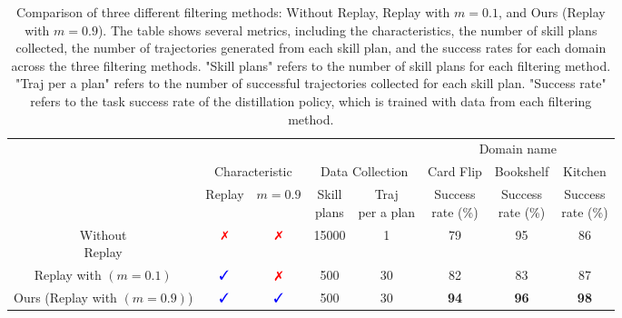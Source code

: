 \begin{table*}[ht]

\centering

\begin{tabular}{ccc|cc|c|c|c}
    \toprule
    &  & \multicolumn{2}{c}{} & & \multicolumn{3}{c}{Domain name}\\
    \cmidrule(lr){6-8}
    & \multicolumn{2}{c|}{Characteristic} & \multicolumn{2}{c|}{Data Collection} & Card Flip & Bookshelf & Kitchen   \\
    \cmidrule(lr){2-5} \cmidrule(lr){6-6}\cmidrule(lr){7-7}\cmidrule(lr){8-8}
    & Replay & $m=0.9$ & \makecell{Skill \\ plans} & \makecell{Traj \\ per a plan} &
    \makecell{Success \\ rate (\%)}  &  \makecell{Success \\ rate (\%)}  &\makecell{Success \\ rate (\%)}  \\
    \cmidrule(lr){1-1} \cmidrule(lr){2-5} \cmidrule(lr){6-6}\cmidrule(lr){7-7}\cmidrule(lr){8-8}
    \makecell{Without\\ Replay} & 
    $\textcolor{red}{\xmark}$ & 
    $\textcolor{red}{\xmark}$
    & 15000
    & 1
    & 79
    & 95
    & 86
    \\
    \midrule
    \makecell{Replay \\with $(m=0.1)$} & 
    $\textcolor{blue}{\cmark}$ & 
    $\textcolor{red}{\xmark}$ 
    & 500
    & 30
    & 82
    & 83
    & 87
    \\
    \midrule
    \makecell{Ours (Replay\\ with $(m=0.9)$)} & 
    $\textcolor{blue}{\cmark}$ & 
    $\textcolor{blue}{\cmark}$
    & 500
    & 30
    & \textbf{94}
    & \textbf{96}
    & \textbf{98}
    \\
    \bottomrule
\end{tabular}

\caption{Comparison of three different filtering methods: Without Replay, Replay with \( m = 0.1 \), and Ours (Replay with \( m = 0.9 \)). The table shows several metrics, including the characteristics, the number of skill plans collected, the number of trajectories generated from each skill plan, and the success rates for each domain across the three filtering methods. "Skill plans" refers to the number of skill plans for each filtering method. "Traj per a plan" refers to the number of successful trajectories collected for each skill plan. "Success rate" refers to the task success rate of the distillation policy, which is trained with data from each filtering method.}

\label{table:ablation_dataQ}
\end{table*}
